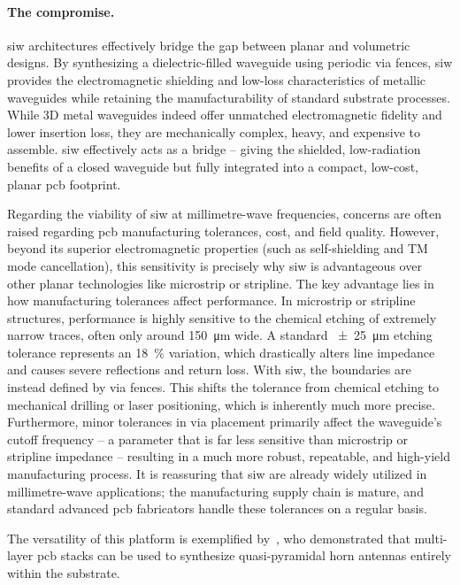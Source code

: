 \paragraph{The compromise.}
\gls{siw} architectures effectively bridge the gap between planar and volumetric designs.
By synthesizing a dielectric-filled waveguide using periodic via fences, \gls{siw} provides the electromagnetic shielding and low-loss characteristics of metallic waveguides while retaining the manufacturability of standard substrate processes.
While 3D metal waveguides indeed offer unmatched electromagnetic fidelity and lower insertion loss, they are mechanically complex, heavy, and expensive to assemble.
\gls{siw} effectively acts as a bridge -- giving the shielded, low-radiation benefits of a closed waveguide but fully integrated into a compact, low-cost, planar \gls{pcb} footprint.

Regarding the viability of \gls{siw} at millimetre-wave frequencies, concerns are often raised regarding \gls{pcb} manufacturing tolerances, cost, and field quality.
However, beyond its superior electromagnetic properties (such as self-shielding and TM mode cancellation), this sensitivity is precisely why \gls{siw} is advantageous over other planar technologies like microstrip or stripline.
The key advantage lies in how manufacturing tolerances affect performance.
In microstrip or stripline structures, performance is highly sensitive to the chemical etching of extremely narrow traces, often only around \qty{150}{\um} wide.
A standard \qty{\pm25}{\um} etching tolerance represents an \qty{18}{\percent} variation, which drastically alters line impedance and causes severe reflections and return loss.
With \gls{siw}, the boundaries are instead defined by via fences.
This shifts the tolerance from chemical etching to mechanical drilling or laser positioning, which is inherently much more precise.
Furthermore, minor tolerances in via placement primarily affect the waveguide's cutoff frequency -- a parameter that is far less sensitive than microstrip or stripline impedance -- resulting in a much more robust, repeatable, and high-yield manufacturing process.
It is reassuring that \gls{siw} are already widely utilized in millimetre-wave applications; the manufacturing supply chain is mature, and standard advanced \gls{pcb} fabricators handle these tolerances on a regular basis.

The versatility of this platform is exemplified by~\textcite{zhaoSIWQuasiPyramidHorn2024}, who demonstrated that multi-layer \gls{pcb} stacks can be used to synthesize quasi-pyramidal horn antennas entirely within the substrate.

